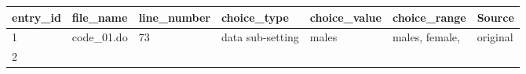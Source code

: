 \documentclass[]{book}
\begin{document}
\begin{longtable}[]{@{}lllllll@{}}
\toprule
\begin{minipage}[b]{0.05\columnwidth}\raggedright
entry\_id\strut
\end{minipage} & \begin{minipage}[b]{0.07\columnwidth}\raggedright
file\_name\strut
\end{minipage} & \begin{minipage}[b]{0.08\columnwidth}\raggedright
line\_number\strut
\end{minipage} & \begin{minipage}[b]{0.12\columnwidth}\raggedright
choice\_type\strut
\end{minipage} & \begin{minipage}[b]{0.19\columnwidth}\raggedright
choice\_value\strut
\end{minipage} & \begin{minipage}[b]{0.18\columnwidth}\raggedright
choice\_range\strut
\end{minipage} & \begin{minipage}[b]{0.12\columnwidth}\raggedright
Source\strut
\end{minipage}\tabularnewline
\midrule
\endhead
\begin{minipage}[t]{0.05\columnwidth}\raggedright
1\strut
\end{minipage} & \begin{minipage}[t]{0.07\columnwidth}\raggedright
code\_01.do\strut
\end{minipage} & \begin{minipage}[t]{0.08\columnwidth}\raggedright
73\strut
\end{minipage} & \begin{minipage}[t]{0.12\columnwidth}\raggedright
data sub-setting\strut
\end{minipage} & \begin{minipage}[t]{0.19\columnwidth}\raggedright
males\strut
\end{minipage} & \begin{minipage}[t]{0.18\columnwidth}\raggedright
males, female,\strut
\end{minipage} & \begin{minipage}[t]{0.12\columnwidth}\raggedright
original\strut
\end{minipage}\tabularnewline
\begin{minipage}[t]{0.05\columnwidth}\raggedright
2\strut
\end{minipage} & \begin{minipage}[t]{0.07\columnwidth}\raggedright

\end{minipage}
\end{longtable}
\end{document}
